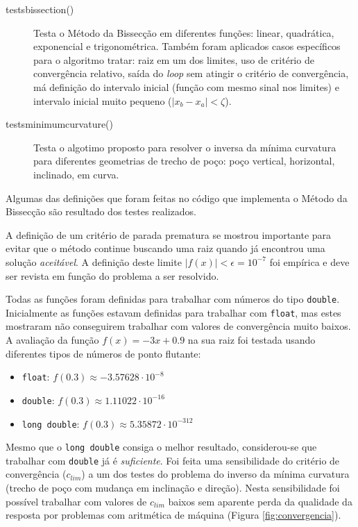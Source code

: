 \documentclass[final,5p]{elsarticle}
\numberwithin{equation}{section}
\begin{document}
    \begin{description}
        \item[tests\textunderscore bissection()] Testa o Método da Bissecção em diferentes funções: linear, quadrática, exponencial e trigonométrica. Também foram aplicados casos específicos para o algoritmo tratar: raiz em um dos limites, uso de critério de convergência relativo, saída do \emph{loop} sem atingir o critério de convergência, má definição do intervalo inicial (função com mesmo sinal nos limites) e intervalo inicial muito pequeno ($|x_b - x_a| < \zeta$).
        
        \item[tests\textunderscore minimum\textunderscore curvature()] Testa o algotimo proposto para resolver o inversa da mínima curvatura para diferentes geometrias de trecho de poço: poço vertical, horizontal, inclinado, em curva.
    \end{description}

    Algumas das definições que foram feitas no código que implementa o Método da Bissecção são resultado dos testes realizados.

    A definição de um critério de parada prematura se mostrou importante para evitar que o método continue buscando uma raiz quando já encontrou uma solução \emph{aceitável}. A definição deste limite $|f(x)| < \epsilon = 10^{-7}$ foi empírica e deve ser revista em função do problema a ser resolvido.
    
    Todas as funções foram definidas para trabalhar com números do tipo \verb|double|. Inicialmente as funções estavam definidas para trabalhar com \verb|float|, mas estes mostraram não conseguirem trabalhar com valores de convergência muito baixos. A avaliação da função $f(x) = -3x+0.9$ na sua raiz foi testada usando diferentes tipos de números de ponto flutante:

    \begin{itemize}
        \item \verb|float|: $f(0.3) \approx -3.57628 \cdot 10^{-8}$ 
        \item \verb|double|: $f(0.3) \approx 1.11022 \cdot 10^{-16}$ 
        \item \verb|long double|: $f(0.3) \approx 5.35872 \cdot 10^{-312}$ 
    \end{itemize}
    
    Mesmo que o \verb|long double| consiga o melhor resultado, considerou-se que trabalhar com \verb|double| já é \emph{suficiente}. Foi feita uma sensibilidade do critério de convergência ($c_{lim}$) a um dos testes do problema do inverso da mínima curvatura (trecho
    de poço com mudança em inclinação e direção). Nesta sensibilidade foi possível trabalhar com valores de $c_{lim}$ baixos sem aparente perda da qualidade da resposta por problemas com aritmética de máquina (Figura \ref{fig:convergencia}).
    
\end{document}
